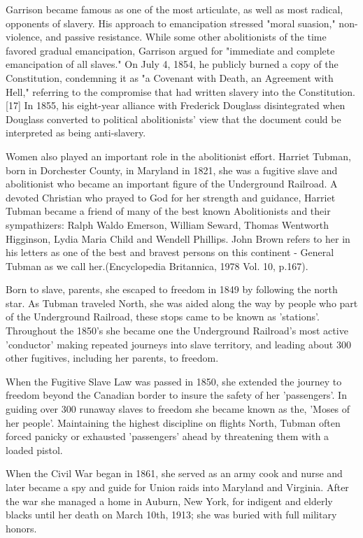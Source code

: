 \documentclass[a4paper]{article}
\begin{document}
Garrison became famous as one of the most articulate, as well as most radical, opponents of slavery. His approach to emancipation stressed "moral suasion," non-violence, and passive resistance. While some other abolitionists of the time favored gradual emancipation, Garrison argued for "immediate and complete emancipation of all slaves." On July 4, 1854, he publicly burned a copy of the Constitution, condemning it as "a Covenant with Death, an Agreement with Hell," referring to the compromise that had written slavery into the Constitution.[17] In 1855, his eight-year alliance with Frederick Douglass disintegrated when Douglass converted to political abolitionists' view that the document could be interpreted as being anti-slavery.


Women also played an important role in the abolitionist effort. Harriet Tubman, born in Dorchester County, in Maryland in 1821, she was a fugitive slave and abolitionist who became an important figure of the Underground Railroad. A devoted Christian who prayed to God for her strength and guidance, Harriet Tubman became a friend of many of the best known Abolitionists and their sympathizers: Ralph Waldo Emerson, William Seward, Thomas Wentworth Higginson, Lydia Maria Child and Wendell Phillips. John Brown refers to her in his letters as one of the best and bravest persons on this continent - General Tubman as we call her.(Encyclopedia Britannica, 1978 Vol. 10, p.167).

Born to slave, parents, she escaped to freedom in 1849 by following the north star. As Tubman traveled North, she was aided along the way by people who part of the Underground Railroad, these stops came to be known as 'stations'. Throughout the 1850's she became one the Underground Railroad's most active 'conductor' making repeated journeys into slave territory, and leading about 300 other fugitives, including her parents, to freedom.

When the Fugitive Slave Law was passed in 1850, she extended the journey to freedom beyond the Canadian border to insure the safety of her 'passengers'. In guiding over 300 runaway slaves to freedom she became known as the, 'Moses of her people'. Maintaining the highest discipline on flights North, Tubman often forced panicky or exhausted 'passengers' ahead by threatening them with a loaded pistol.






When the Civil War began in 1861, she served as an army cook and nurse and later became a spy and guide for Union raids into Maryland and Virginia. After the war she managed a home in Auburn, New York, for indigent and elderly blacks until her death on March 10th, 1913; she was buried with full military honors.
\end{document}
